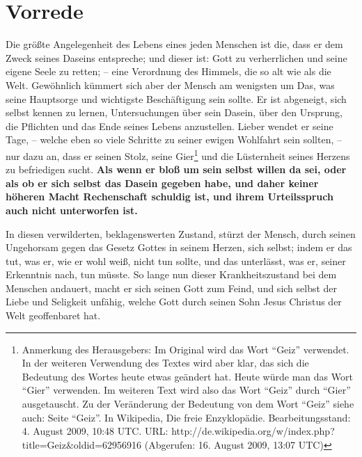 \chapter{Vorrede}

Die größte Angelegenheit des Lebens eines jeden Menschen ist die, dass er dem
Zweck seines Daseins entspreche; und dieser ist: Gott zu verherrlichen und seine
eigene Seele zu retten; -- eine Verordnung des Himmels, die so alt wie als die
Welt. Gewöhnlich kümmert sich aber der Mensch am wenigsten um Das, was seine
Hauptsorge und wichtigste Beschäftigung sein sollte. Er ist abgeneigt, sich
selbst kennen zu lernen, Untersuchungen über sein Dasein, über den Ursprung, die
Pflichten und das Ende seines Lebens anzustellen. Lieber wendet er seine Tage,
-- welche eben so viele Schritte zu seiner ewigen Wohlfahrt sein sollten, -- nur
dazu an, dass er seinen Stolz, seine Gier\footnote{Anmerkung des Herausgebers:
Im Original wird das Wort "`Geiz"' verwendet. In der weiteren Verwendung des
Textes wird aber klar, das sich die Bedeutung des Wortes heute etwas geändert
hat. Heute würde man das Wort "`Gier"' verwenden. Im weiteren Text wird also das
Wort "`Geiz"' durch "`Gier"' ausgetauscht. Zu der Veränderung der Bedeutung von
dem Wort "`Geiz"' siehe auch: Seite "`Geiz"'. In Wikipedia, Die freie
Enzyklopädie. Bearbeitungsstand: 4. August 2009, 10:48 UTC. URL:
http://de.wikipedia.org/w/index.php?title=Geiz\&oldid=62956916 (Abgerufen: 16.
August 2009, 13:07 UTC) } und die Lüsternheit seines Herzens zu befriedigen
sucht. \textbf{Als wenn er bloß um sein selbst willen da sei, oder als ob er
sich selbst das Dasein gegeben habe, und daher keiner höheren Macht Rechenschaft
schuldig ist, und ihrem Urteilsspruch auch nicht unterworfen ist.}

In diesen verwilderten, beklagenswerten Zustand, stürzt der Mensch, durch seinen
Ungehorsam gegen das Gesetz Gottes in seinem Herzen, sich selbst; indem er das
tut, was er, wie er wohl weiß, nicht tun sollte, und das unterlässt, was er,
seiner Erkenntnis nach, tun müsste. So lange nun dieser Krankheitszustand bei
dem Menschen andauert, macht er sich seinen Gott zum Feind, und sich selbst der
Liebe und Seligkeit unfähig, welche Gott durch seinen Sohn Jesus Christus der
Welt geoffenbaret hat.

